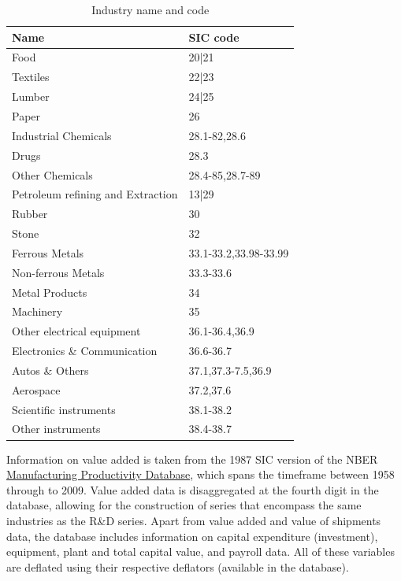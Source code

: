 \documentclass{_latex/house}
\begin{document}
\begin{table}[ht] \footnotesize
\caption{Industry name and code}
\begin{center}
{
\begin{tabular}{| l | l |}
\hline
Name & SIC code \\
\hline
\hline
Food & 20|21 \\ 
\hline
Textiles & 22|23 \\
\hline
Lumber & 24|25 \\
\hline
Paper & 26  \\
\hline
Industrial Chemicals & 28.1-82,28.6  \\
\hline
Drugs & 28.3  \\
\hline
Other Chemicals & 28.4-85,28.7-89 \\
\hline
Petroleum refining and Extraction & 13|29  \\ 
\hline
Rubber & 30  \\
\hline
Stone & 32  \\
\hline
Ferrous Metals & 33.1-33.2,33.98-33.99  \\
\hline
Non-ferrous Metals & 33.3-33.6  \\
\hline
Metal Products & 34  \\
\hline
Machinery & 35  \\
\hline
Other electrical equipment & 36.1-36.4,36.9  \\
\hline
Electronics \& Communication & 36.6-36.7  \\
\hline
Autos \& Others & 37.1,37.3-7.5,36.9  \\
\hline
Aerospace & 37.2,37.6  \\
\hline
Scientific instruments & 38.1-38.2  \\
\hline
Other instruments & 38.4-38.7  \\
\hline
\end{tabular}
}
\label{tab:table17}
\end{center}
\end{table}

Information on value added is taken from the 1987 SIC version of the NBER \href{http://www.nber.org/data/nberces5809.html}{Manufacturing Productivity Database}, which spans the timeframe between 1958 through to 2009. Value added data is disaggregated at the fourth digit in the database, allowing for the construction of series that encompass the same industries as the R\&D series. Apart from value added and value of shipments data, the database includes information on capital expenditure (investment), equipment, plant and total capital value, and payroll data. All of these variables are deflated using their respective deflators (available in the database).
\end{document}
